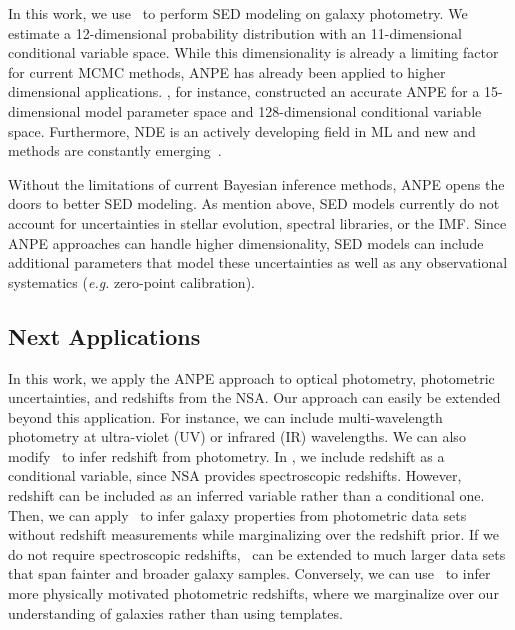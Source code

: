 In this work, we use \sedflow~to perform SED modeling on galaxy photometry. 
We estimate a 12-dimensional probability distribution with an 11-dimensional
conditional variable space. 
While this dimensionality is already a limiting factor for current MCMC
methods, ANPE has already been applied to higher dimensional applications.
\cite{dax2021}, for instance, constructed an accurate ANPE for a
15-dimensional model parameter space and 128-dimensional conditional variable
space.
Furthermore, NDE is an actively developing field in ML and new and methods are
constantly emerging~\citep[\eg][]{wu2020, dhariwal2021}. 

Without the limitations of current Bayesian inference methods, ANPE opens the
doors to better SED modeling. 
As mention above, SED models currently do not account for uncertainties in
stellar evolution, spectral libraries, or the IMF. 
Since ANPE approaches can handle higher dimensionality, SED models can include 
additional parameters that model these uncertainties as well as any
observational systematics (\emph{e.g.} zero-point calibration). 

\subsection{Next Applications} 
In this work, we apply the ANPE approach to optical photometry, photometric
uncertainties, and redshifts from the NSA. 
Our approach can easily be extended beyond this application. 
For instance, we can include multi-wavelength photometry at ultra-violet (UV)
or infrared (IR) wavelengths. 
We can also modify \sedflow~to infer redshift from photometry. 
In \sedflow, we include redshift as a conditional variable, since NSA provides
spectroscopic redshifts. 
However, redshift can be included as an inferred variable rather than a
conditional one. 
Then, we can apply \sedflow~to infer galaxy properties from photometric data
sets without redshift measurements while marginalizing over the redshift
prior. 
If we do not require spectroscopic redshifts, \sedflow~can be extended to much
larger data sets that span fainter and broader galaxy samples. 
Conversely, we can use \sedflow~to infer more physically motivated photometric 
redshifts, where we marginalize over our understanding of galaxies rather than
using templates. 

